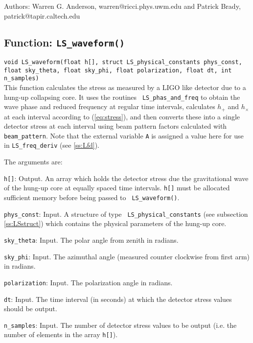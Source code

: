 \begin{description}
\item{Authors:} Warren G. Anderson, warren@ricci.phys.uwm.edu and Patrick Brady,
patrick@tapir.caltech.edu
\end{description}
\newpage

\subsection{Function: {\tt LS\_waveform()}}
{\tt void LS\_waveform(float h[], struct LS\_physical\_constants phys\_const,
           float sky\_theta, float sky\_phi, float polarization, float dt, 
               int n\_samples) }\\
This function calculates the stress as measured by a LIGO like detector
due to a hung-up collapsing core. It uses the routines {\tt 
LS\_phas\_and\_freq} to obtain the wave phase and reduced frequency at
regular time intervals, calculates $h_+$ and $h_\times$ at each interval according 
to (\ref{eq:stress}), and then converts these into a single detector stress 
at each interval using beam pattern factors calculated with 
{\tt beam\_pattern}. Note that the external variable {\tt A} is assigned a
value here for use in {\tt LS\_freq\_deriv} (see \ref{ss:Lfd}).

The arguments are:
\begin{description}
\item{\tt h[]}: Output. An array which holds the detector stress due the 
gravitational wave of the hung-up core at equally spaced time intervals. 
{\tt h[]} must be allocated sufficient memory before being passed to {\tt
LS\_waveform()}.
\item{\tt phys\_const}: Input. A structure of type {\tt
LS\_physical\_constants} (see subsection \ref{ss:LSstruct}) which contains the
physical parameters of the hung-up core.
\item{\tt sky\_theta}: Input. The polar angle from zenith in radians.
\item{\tt sky\_phi}: Input. The azimuthal angle (measured counter clockwise
from first arm) in radians.
\item{\tt polarization}: Input. The polarization angle in radians.
\item{\tt dt}: Input. The time interval (in seconds) at which the detector
stress values should be output.
\item{\tt n\_samples}: Input. The number of detector stress values to be 
output (i.e. the number of elements in the array {\tt h[]}).
\end{description}

